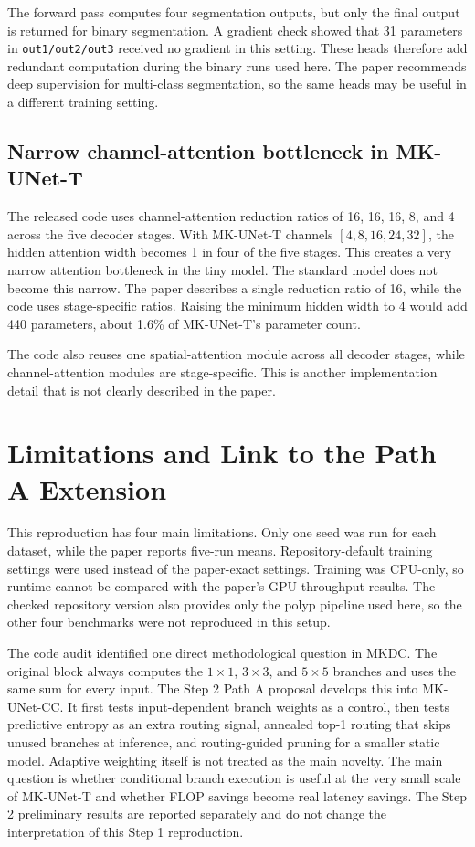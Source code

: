 \documentclass[10pt,a4paper]{article}
\begin{document}
The forward pass computes four segmentation outputs, but only the final output is returned for binary segmentation. A gradient check showed that 31 parameters in \texttt{out1/out2/out3} received no gradient in this setting. These heads therefore add redundant computation during the binary runs used here. The paper recommends deep supervision for multi-class segmentation, so the same heads may be useful in a different training setting.

\subsection{Narrow channel-attention bottleneck in MK-UNet-T}

The released code uses channel-attention reduction ratios of 16, 16, 16, 8, and 4 across the five decoder stages. With MK-UNet-T channels $[4,8,16,24,32]$, the hidden attention width becomes 1 in four of the five stages. This creates a very narrow attention bottleneck in the tiny model. The standard model does not become this narrow. The paper describes a single reduction ratio of 16, while the code uses stage-specific ratios. Raising the minimum hidden width to 4 would add 440 parameters, about 1.6\% of MK-UNet-T's parameter count.

The code also reuses one spatial-attention module across all decoder stages, while channel-attention modules are stage-specific. This is another implementation detail that is not clearly described in the paper.

\section{Limitations and Link to the Path A Extension}

This reproduction has four main limitations. Only one seed was run for each dataset, while the paper reports five-run means. Repository-default training settings were used instead of the paper-exact settings. Training was CPU-only, so runtime cannot be compared with the paper's GPU throughput results. The checked repository version also provides only the polyp pipeline used here, so the other four benchmarks were not reproduced in this setup.

The code audit identified one direct methodological question in MKDC. The original block always computes the $1\times1$, $3\times3$, and $5\times5$ branches and uses the same sum for every input. The Step 2 Path A proposal develops this into MK-UNet-CC. It first tests input-dependent branch weights as a control, then tests predictive entropy as an extra routing signal, annealed top-1 routing that skips unused branches at inference, and routing-guided pruning for a smaller static model. Adaptive weighting itself is not treated as the main novelty. The main question is whether conditional branch execution is useful at the very small scale of MK-UNet-T and whether FLOP savings become real latency savings. The Step 2 preliminary results are reported separately and do not change the interpretation of this Step 1 reproduction.
\end{document}
